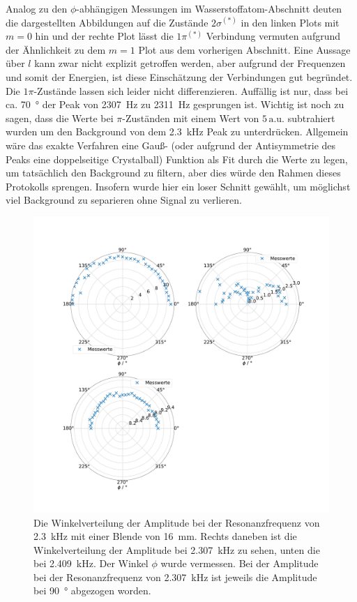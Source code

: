 Analog zu den $\phi$-abhängigen Messungen im Wasserstoffatom-Abschnitt deuten die dargestellten Abbildungen auf die Zustände $2 \sigma^{(*)}$ in den linken Plots mit $m = 0$ hin und der rechte Plot lässt die $1 \pi^{(*)}$ Verbindung vermuten aufgrund der Ähnlichkeit zu dem $m=1$ Plot aus dem vorherigen Abschnitt. Eine Aussage über $l$ kann zwar nicht explizit getroffen werden, aber aufgrund der Frequenzen und somit der Energien, ist diese Einschätzung der Verbindungen gut begründet. Die $1 \pi$-Zustände lassen sich leider nicht differenzieren. Auffällig ist nur, dass bei ca. \SI{70}{\degree} der Peak von \SI{2307}{\hertz} zu \SI{2311}{\hertz} gesprungen ist. Wichtig ist noch zu sagen, dass die Werte bei $\pi$-Zuständen  mit einem Wert von $\num {5}\, \mathrm{a.u.}$ subtrahiert wurden um den Background von dem \SI{2.3}{\kilo\hertz} Peak zu unterdrücken. Allgemein wäre das exakte Verfahren eine Gauß- (oder aufgrund der Antisymmetrie des Peaks eine doppelseitige Crystalball) Funktion als Fit durch die Werte zu legen, um tatsächlich den Background zu filtern, aber dies würde den Rahmen dieses Protokolls sprengen. Insofern wurde hier ein loser Schnitt gewählt, um möglichst viel Background zu separieren ohne Signal zu verlieren. 

\begin{figure}
    \centering
    \includegraphics[width=\textwidth]{plots/D_3.pdf}
    \caption{Die Winkelverteilung der Amplitude bei der Resonanzfrequenz von \SI{2.3}{\kilo\hertz} mit einer Blende von \SI{16}{\milli\metre}. Rechts daneben ist die Winkelverteilung der Amplitude bei \SI{2.307}{\kilo\hertz} zu sehen, unten die bei \SI{2.409}{\kilo\hertz}. Der Winkel $\phi$ wurde vermessen. Bei der Amplitude bei der Resonanzfrequenz von \SI{2.307}{\kilo\hertz} ist jeweils die Amplitude bei \SI{90}{\degree} abgezogen worden.}
    \label{fig:polar_molekuel}
\end{figure}

